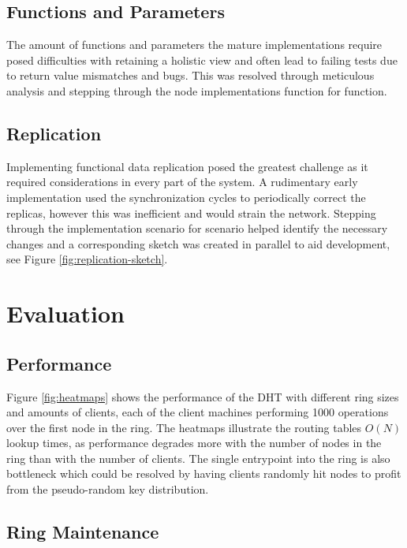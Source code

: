 \documentclass[a4paper, 11pt]{article}
\begin{document}
\subsection{Functions and Parameters}

The amount of functions and parameters the mature implementations require posed difficulties with retaining a holistic view and often lead to failing tests due to return value mismatches and bugs. 
This was resolved through meticulous analysis and stepping through the node implementations function for function.

\subsection{Replication}

Implementing functional data replication posed the greatest challenge as it required considerations in every part of the system.
A rudimentary early implementation used the synchronization cycles to periodically correct the replicas, however this was inefficient and would strain the network. 
Stepping through the implementation scenario for scenario helped identify the necessary changes and a corresponding sketch was created in parallel to aid development, see Figure \ref{fig:replication-sketch}.

\section{Evaluation}

\subsection{Performance}

Figure \ref{fig:heatmaps} shows the performance of the DHT with different ring sizes and amounts of clients, each of the client machines performing 1000 operations over the first node in the ring.
The heatmaps illustrate the routing tables $O(N)$ lookup times, as performance degrades more with the number of nodes in the ring than with the number of clients.
The single entrypoint into the ring is also bottleneck which could be resolved by having clients randomly hit nodes to profit from the pseudo-random key distribution.

\subsection{Ring Maintenance}
\end{document}
